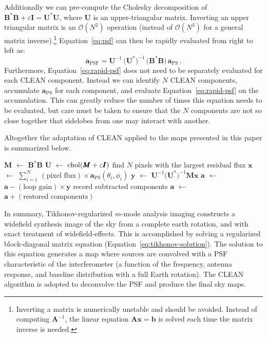 \documentclass[twocolumn]{aastex61}
\newcommand*\Let[2]{\State #1 $\gets$ #2}
\newcommand{\todo}[1]{\textcolor{red}{TODO: #1}\PackageWarning{TODO:}{#1!}}
\renewcommand{\b}{\pmb}
\begin{document}
Additionally we can pre-compute the Cholesky decomposition of $\b B^*\b B + \varepsilon\b I = \b
U^*\b U$, where $\b U$ is an upper-triangular matrix. Inverting an upper triangular matrix is an
$\mathcal{O}(N^2)$ operation (instead of $\mathcal{O}(N^3)$ for a general matrix inverse).\footnote{
    Inverting a matrix is numerically unstable and should be avoided. Instead of computing $\b
    A^{-1}$, the linear equation $\b A\b x = \b b$ is solved each time the matrix inverse is needed.
}
Equation~\ref{eq:psf} can then be rapidly evaluated from right to left as:
\begin{equation}\label{eq:rapid-psf}
    \b a_\text{PSF} =
        \b U^{-1}\,\big(\b U^*\big)^{-1}\,\big(\b B^*\b B\big)\,\b a_\text{PS}\,.
\end{equation}
Furthermore, Equation~\ref{eq:rapid-psf} does not need to be separately evaluated for each CLEAN
component. Instead we can identify $N$ CLEAN components, accumulate $\b a_\text{PS}$ for each
component, and evaluate Equation~\ref{eq:rapid-psf} on the accumulation. This can greatly reduce the
number of times this equation needs to be evaluated, but care must be taken to ensure that the $N$
components are not so close together that sidelobes from one may interact with another.


Altogether the adaptation of CLEAN applied to the maps presented in this paper is summarized below.
\begin{algorithmic}[1]
    \Require{$\b a$ is the solution to Equation~\ref{eq:tikhonov-solution}}
    \Function{CLEAN}{$\b a$}
    \Let{$\b M$}{$\b B^*\b B$}
    \Let{$\b U$}{${\rm chol}(\b M + \varepsilon\b I)$} 
    \State find $N$ pixels with the largest residual flux
    \Let{$\b x$}{$\sum_{i=1}^N \,(\text{pixel flux}) \times \b a_\text{PS}(\theta_i, \phi_i)$}
    \Let{$\b y$}{$\b U^{-1}\big(\b U^*\big)^{-1}\b M\b x$}
    \Let{$\b a$}{$\b a - (\text{loop gain})\times\b y$}
    \State record subtracted components
    \EndWhile
    \Let{$\b a$}{$\b a + (\text{restored components})$}
    \State \Return{$\b a$}
    \EndFunction
\end{algorithmic}

In summary, Tikhonov-regularized $m$-mode analysis imaging constructs a widefield synthesis image of
the sky from a complete earth rotation, and  with exact treatment of widefield-effects. This is
accomplished by solving a regularized block-diagonal matrix equation
(Equation~\ref{eq:tikhonov-solution}). The solution to this equation generates a map where
sources are convolved with a PSF characteristic of the interferometer (a function of the frequency,
antenna response, and baseline distribution with a full Earth rotation). The CLEAN algorithm is
adopted to deconvolve the PSF and produce the final sky maps.
\end{document}
